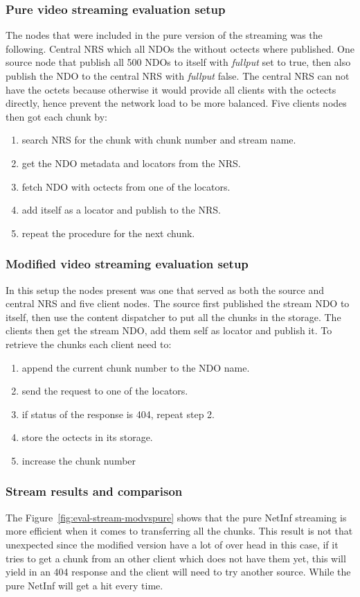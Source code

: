 \subsubsection{Pure video streaming evaluation setup}
The nodes that were included in the pure version of the streaming was the following. 
Central NRS which all NDOs the without octects where published. 
One source node that publish all 500 NDOs to itself with \textit{fullput} set to true, then also publish the NDO to the central NRS with \textit{fullput} false. The central NRS can not have the octets because otherwise it would provide all clients with the octects directly, hence prevent the network load to be more balanced.
Five clients nodes then got each chunk by:
\begin{enumerate}
\item search NRS for the chunk with chunk number and stream name.
\item get the NDO metadata and locators from the NRS.
\item fetch NDO with octects from one of the locators.
\item add itself as a locator and publish to the NRS.
\item repeat the procedure for the next chunk.
\end{enumerate}

\subsubsection{Modified video streaming evaluation setup}
In this setup the nodes present was one that served as both the source and central NRS and five client nodes. The source first published the stream NDO to itself, then use the content dispatcher to put all the chunks in the storage.
The clients then get the stream NDO, add them self as locator and publish it. To retrieve the chunks each client need to:
\begin{enumerate}
\item append the current chunk number to the NDO name.
\item send the request to one of the locators.
\item if status of the response is 404, repeat step 2.
\item store the octects in its storage.
\item increase the chunk number
\end{enumerate}

\subsubsection{Stream results and comparison} 
The Figure~\ref{fig:eval-stream-modvspure} shows that the pure NetInf streaming is more efficient when it comes to transferring all the chunks. This result is not that unexpected since the modified version have a lot of over head in this case, if it tries to get a chunk from an other client which does not have them yet, this will yield in an 404 response and the client will need to try another source. While the pure NetInf will get a hit every time. 
 
